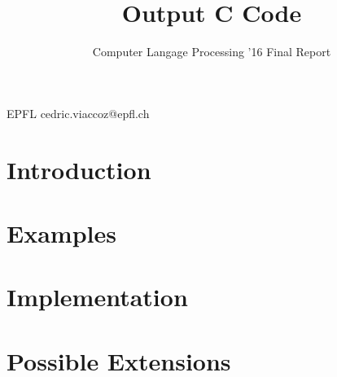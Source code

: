 \documentclass[nocopyrightspace,11pt,authoryear,preprint]{sigplanconf}
\begin{document}


\title{Output C Code}
\subtitle{Computer Langage Processing '16 Final Report}

           {EPFL}
           {cedric.viaccoz@epfl.ch}

\maketitle

\section{Introduction}


\section{Examples}


\section{Implementation}


\section{Possible Extensions}




\end{document}
